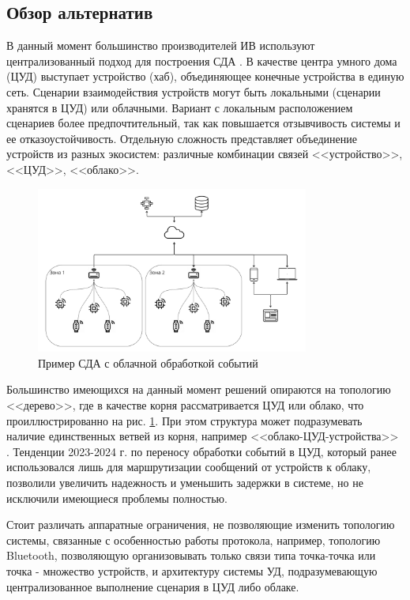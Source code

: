 \documentclass[a4paper,12pt]{article}
\begin{document}
\subsection{Обзор альтернатив}
В данный момент большинство производителей ИВ используют централизованный подход для построения СДА \cite{Rus_alternative}. В качестве центра умного дома (ЦУД) выступает устройство (хаб), объединяющее конечные устройства в единую сеть. Сценарии взаимодействия устройств могут быть локальными (сценарии хранятся в ЦУД) или облачными. Вариант с локальным расположением сценариев более предпочтительный, так как повышается отзывчивость системы и ее отказоустойчивость. Отдельную сложность представляет объединение устройств из разных экосистем: различные комбинации связей <<устройство>>, <<ЦУД>>, <<облако>>.
\begin{figure}[h]
    \centering
    \includegraphics[width=0.8\textwidth]{images/CommertialAlternativeDesign.png}
    \caption{Пример СДА с облачной обработкой событий}
    \label{fig:cloud_event_processing}
\end{figure}

Большинство имеющихся на данный момент решений опираются на топологию <<дерево>>, где в качестве корня рассматривается ЦУД или облако, что проиллюстрированно на рис. \ref{fig:cloud_event_processing}. При этом структура может подразумевать наличие единственных ветвей из корня, например <<облако-ЦУД-устройства>> \cite{smart_home_review}. Тенденции 2023-2024 г. по переносу обработки событий в ЦУД, который ранее использовался лишь для маршрутизации сообщений от устройств к облаку, позволили увеличить надежность и уменьшить задержки в системе, но не исключили имеющиеся проблемы полностью.

Стоит различать аппаратные ограничения, не позволяющие изменить топологию системы, связанные с особенностью работы протокола, например, топологию Bluetooth, позволяющую организовывать только связи типа точка-точка или точка - множество устройств, и архитектуру системы УД, подразумевающую централизованное выполнение сценария в ЦУД либо облаке.
\end{document}
